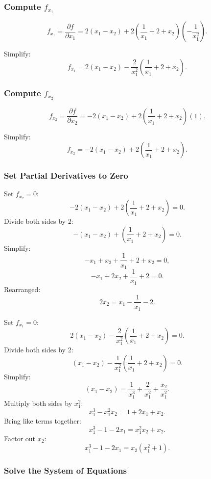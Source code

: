 \documentclass[11pt]{article}
\begin{document}
\subsubsection{Compute \( f_{x_1} \)}

\[
f_{x_1} = \frac{\partial f}{\partial x_1} = 2(x_1 - x_2) + 2\left( \frac{1}{x_1} + 2 + x_2 \right) \left( -\frac{1}{x_1^2} \right).
\]

Simplify:
\[
f_{x_1} = 2(x_1 - x_2) - \frac{2}{x_1^2} \left( \frac{1}{x_1} + 2 + x_2 \right).
\]

\newpage

\subsubsection{Compute \( f_{x_2} \)}

\[
f_{x_2} = \frac{\partial f}{\partial x_2} = -2(x_1 - x_2) + 2\left( \frac{1}{x_1} + 2 + x_2 \right)(1).
\]

Simplify:
\[
f_{x_2} = -2(x_1 - x_2) + 2\left( \frac{1}{x_1} + 2 + x_2 \right).
\]

\newpage

\subsubsection{Set Partial Derivatives to Zero}

Set \( f_{x_2} = 0 \):
\[
-2(x_1 - x_2) + 2\left( \frac{1}{x_1} + 2 + x_2 \right) = 0.
\]
Divide both sides by 2:
\[
-(x_1 - x_2) + \left( \frac{1}{x_1} + 2 + x_2 \right) = 0.
\]
Simplify:
\[
-x_1 + x_2 + \frac{1}{x_1} + 2 + x_2 = 0,
\]
\[
- x_1 + 2 x_2 + \frac{1}{x_1} + 2 = 0.
\]
Rearranged:
\[
2 x_2 = x_1 - \frac{1}{x_1} - 2.
\]

Set \( f_{x_1} = 0 \):
\[
2(x_1 - x_2) - \frac{2}{x_1^2} \left( \frac{1}{x_1} + 2 + x_2 \right) = 0.
\]
Divide both sides by 2:
\[
(x_1 - x_2) - \frac{1}{x_1^2} \left( \frac{1}{x_1} + 2 + x_2 \right) = 0.
\]
Simplify:
\[
(x_1 - x_2) = \frac{1}{x_1^3} + \frac{2}{x_1^2} + \frac{x_2}{x_1^2}.
\]
Multiply both sides by \( x_1^2 \):
\[
x_1^3 - x_1^2 x_2 = 1 + 2 x_1 + x_2.
\]
Bring like terms together:
\[
x_1^3 - 1 - 2 x_1 = x_1^2 x_2 + x_2.
\]
Factor out \( x_2 \):
\[
x_1^3 - 1 - 2 x_1 = x_2 ( x_1^2 + 1 ).
\]

\newpage

\subsubsection{Solve the System of Equations}
\end{document}
